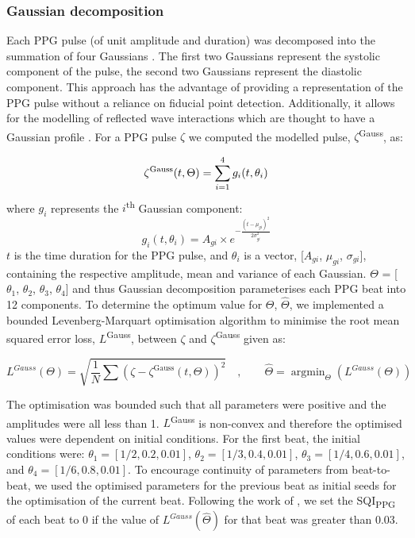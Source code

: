 \documentclass[fleqn,10pt]{wlscirep}
\DeclareMathOperator*{\argmin}{argmin} %
\begin{document}
\subsubsection{Gaussian decomposition}

Each PPG pulse (of unit amplitude and duration) was decomposed into the summation of four Gaussians \cite{Rubins2008}. The first two Gaussians represent the systolic component of the pulse, the second two Gaussians represent the diastolic component. This approach has the advantage of providing a representation of the PPG pulse without a reliance on fiducial point detection. Additionally, it allows for the modelling of reflected wave interactions which are thought to have a Gaussian profile \cite{Sola2019}. For a PPG pulse $\zeta$ we computed the modelled pulse, $\zeta$\textsuperscript{Gauss}, as:

\begin{equation}
	\text{$\zeta$\textsuperscript{Gauss}}(t, \Theta) = \sum_{i=1}^4 g_i(t, \theta _i)
\end{equation}
where $g_i$ represents the $i$\textsuperscript{th} Gaussian component:
\begin{equation}
	g_i(t, \theta _i) = A_{gi} \times	e^{-\frac{(t-\mu_{gi})^2}{2\sigma_{gi}^2}}
\end{equation}
$t$ is the time duration for the PPG pulse, and $\theta _i$ is a vector, [$A_{gi}$, $\mu_{gi}$, $\sigma_{gi}$], containing the respective amplitude, mean and variance of each Gaussian. $\Theta$ = [$\theta _1$, $\theta _2$, $\theta _3$, $\theta _4$] and thus Gaussian decomposition parameterises each PPG beat into 12 components. To determine the optimum value for $\Theta$, $\hat{\Theta}$, we implemented a bounded Levenberg-Marquart optimisation algorithm to minimise the root mean squared error loss, $L$\textsuperscript{Gauss}, between $\zeta$ and $\zeta$\textsuperscript{Gauss} given as:



\begin{equation}
\mathit{L^{\text{Gauss}}}(\Theta) = \sqrt{\frac{1}{N}\sum(\zeta-\zeta^{\text{Gauss}}(t, \Theta))^2}
\quad, \qquad \hat{\Theta} = \argmin_{\Theta} (\mathit{L^{\text{Gauss}}}(\Theta))
\end{equation}

The optimisation was bounded such that all parameters were positive and the amplitudes were all less than 1. $L$\textsuperscript{Gauss} is non-convex and therefore the optimised values were dependent on initial conditions. For the first beat, the initial conditions were: $\theta_1 = [1/2, 0.2, 0.01]$, $\theta_2 = [1/3 , 0.4,  0.01]$, $\theta_3 = [1/4, 0.6,  0.01]$, and $\theta_4 = [1/6, 0.8,  0.01]$. To encourage continuity of parameters from beat-to-beat, we used the optimised parameters for the previous beat as initial seeds for the optimisation of the current beat. Following the work of \cite{Wang2013}, we set the SQI\textsubscript{PPG} of each beat to 0 if the value of $\mathit{L^{\text{Gauss}}}(\hat{\Theta})$ for that beat was greater than 0.03.
\end{document}
